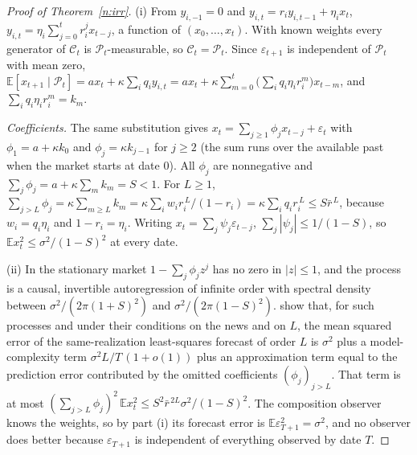 \begin{proof}[Proof of Theorem~\ref{n:irr}]
(i) From $y_{i,-1}=0$ and $y_{i,t}=r_iy_{i,t-1}+\eta_ix_t$, $y_{i,t}=\eta_i\sum_{j=0}^tr_i^jx_{t-j}$, a function of $(x_0,\ldots,x_t)$. With known weights every generator of $\mathcal C_t$ is $\mathcal P_t$-measurable, so $\mathcal C_t=\mathcal P_t$. Since $\varepsilon_{t+1}$ is independent of $\mathcal P_t$ with mean zero,
$\mathbb E[x_{t+1}\mid\mathcal P_t]=ax_t+\kappa\sum_iq_iy_{i,t}=ax_t+\kappa\sum_{m=0}^t\big(\sum_iq_i\eta_ir_i^m\big)x_{t-m}$, and $\sum_iq_i\eta_ir_i^m=k_m$.

\emph{Coefficients.} The same substitution gives $x_t=\sum_{j\ge1}\phi_jx_{t-j}+\varepsilon_t$ with $\phi_1=a+\kappa k_0$ and $\phi_j=\kappa k_{j-1}$ for $j\ge2$ (the sum runs over the available past when the market starts at date $0$). All $\phi_j$ are nonnegative and $\sum_j\phi_j=a+\kappa\sum_mk_m=S<1$. For $L\ge1$, $\sum_{j>L}\phi_j=\kappa\sum_{m\ge L}k_m=\kappa\sum_iw_ir_i^{\,L}/(1-r_i)=\kappa\sum_iq_ir_i^{\,L}\le S\bar r^{\,L}$, because $w_i=q_i\eta_i$ and $1-r_i=\eta_i$. Writing $x_t=\sum_j\psi_j\varepsilon_{t-j}$, $\sum_j|\psi_j|\le1/(1-S)$, so $\mathbb Ex_t^2\le\sigma^2/(1-S)^2$ at every date.

(ii) In the stationary market $1-\sum_j\phi_jz^j$ has no zero in $|z|\le1$, and the process is a causal, invertible autoregression of infinite order with spectral density between $\sigma^2/(2\pi(1+S)^2)$ and $\sigma^2/(2\pi(1-S)^2)$. \citet{ingwei2003} show that, for such processes and under their conditions on the news and on $L$, the mean squared error of the same-realization least-squares forecast of order $L$ is $\sigma^2$ plus a model-complexity term $\sigma^2L/T\,(1+o(1))$ plus an approximation term equal to the prediction error contributed by the omitted coefficients $(\phi_j)_{j>L}$. That term is at most $(\sum_{j>L}\phi_j)^2\,\mathbb Ex_t^2\le S^2\bar r^{\,2L}\sigma^2/(1-S)^2$. The composition observer knows the weights, so by part (i) its forecast error is $\mathbb E\varepsilon_{T+1}^2=\sigma^2$, and no observer does better because $\varepsilon_{T+1}$ is independent of everything observed by date $T$.


\end{proof}
